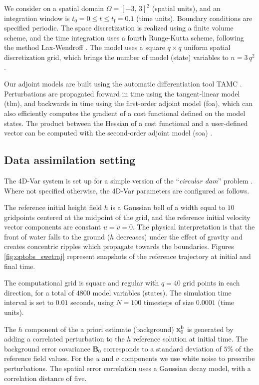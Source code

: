 \documentclass{article}
\newcommand{\B}{\mathbf{B}}
\newcommand{\xb}{ \mathbf{x}^{\rm b} }
\begin{document}
We consider on a spatial domain $\Omega = [-3,\,3]^2$ (spatial units), 
and an integration window is $t_0 = 0 \le t \le t_\textrm{f} = 0.1$ (time units). 
Boundary conditions are specified periodic. The space discretization is realized using a finite volume scheme, 
and the time integration uses a fourth Runge-Kutta scheme, following the method Lax-Wendroff \cite{Wendroff_1998}.
The model uses a square $q \times q$ uniform spatial discretization grid, which brings the number of model (state) variables to $n = 3\,q^2$.

Our adjoint models are built using the automatic differentiation tool TAMC \cite{giering1997tangent,TAMC}. 
Perturbations are propagated forward in time using the tangent-linear model ({\sc tlm}),
and backwards in time using the first-order adjoint model ({\sc foa}), which can also efficiently computes 
the gradient of a cost functional defined on the model states. 
The product between the Hessian of a cost functional and a user-defined vector can be computed with 
the second-order adjoint model ({\sc soa}) \cite{Cioaca_2011}. 



\subsection{Data assimilation setting}\label{sec:optobs_dasetup}


The 4D-Var system is set up for a simple version of the ``\textit{circular dam}'' problem \cite{anastasiou1997solution}.
Where not specified otherwise, the 4D-Var parameters are configured as follows.

The reference initial height field $h$ is a Gaussian bell of a width equal to $10$ gridpoints centered at the midpoint of the grid, 
and the reference initial velocity vector components are constant $u=v=0$. 
The physical interpretation is that the front of water falls to the ground ($h$ decreases) under the effect of gravity
and creates concentric ripples which propagate towards the boundaries. 
Figures \ref{fig:optobs_swetraj} represent snapshots of the reference trajectory at initial and final time. 

The computational grid is square and regular with $q=40$ grid points in each direction, for a total of $4800$ model variables (states).
The simulation time interval is set to $0.01$ seconds, using $N=100$ timesteps of size $0.0001$ (time units).

The $h$ component of the a priori estimate (background) $\xb_0$ is generated by adding a correlated perturbation to the $h$ reference solution at initial time.
The background error covariance $\B_0$ corresponds to a standard deviation of $5\%$ of the reference field values.
For the $u$ and $v$ components we use white noise to prescribe perturbations.
The spatial error correlation uses a Gaussian decay model, with a correlation distance of five. 
\end{document}
